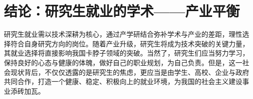 \documentclass[12pt,a4paper]{ctexart}
\begin{document}
\section{结论：研究生就业的学术——产业平衡}

研究生就业需以技术深耕为核心，通过产学研结合弥补学术与产业的差距，理性选择符合自身研究方向的岗位。随着产业升级，研究生将成为技术突破的关键力量，其就业选择将直接影响我国卡脖子领域的突破。当然了，研究生们应当努力学习，保持良好的心态与健康的体魄，做好自己的职业规划，为自己负责。但是，这一社会现状背后，不仅仅透露的是研究生的焦虑，更应当是由学生、高校、企业与政府共同合作，打造一个健康、稳定、积极向上的就业环境，为我国的社会主义建设事业添砖加瓦。
\end{document}
